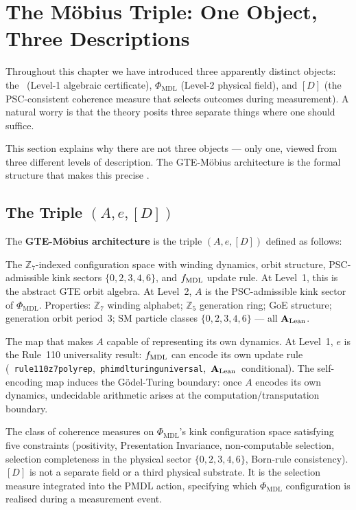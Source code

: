 \documentclass[11pt,openany]{book}
\theoremstyle{remark}
\newcommand{\PHIMDL}{\Phi_{\mathrm{MDL}}}
\newcommand{\ZS}{\mathbb{Z}_7}
\newcommand{\lean}[1]{%
  \penalty-100
  \begingroup\def\_{\textunderscore\allowbreak}\texttt{#1}\endgroup}
\newcommand{\CMCA}{\text{CMCA}}
\newcommand{\CatAL}{\ensuremath{\textbf{A}_{\rm Lean}}}
\begin{document}
\section{The M\"{o}bius Triple: One Object, Three Descriptions}
\label{sec:mobius}

Throughout this chapter we have introduced three apparently distinct objects: the \CMCA\
(Level-1 algebraic certificate), $\PHIMDL$ (Level-2 physical field), and $[D]$ (the
PSC-consistent coherence measure that selects outcomes during measurement).
A natural worry is that the theory posits three separate things where one should suffice.

This section explains why there are not three objects --- only one, viewed from three
different levels of description.
The GTE-Möbius architecture is the formal structure that makes this precise \cite{SpivackGTEMobius}.

\subsection*{The Triple $(A,e,[D])$}

The \textbf{GTE-Möbius architecture} is the triple $(A, e, [D])$ defined as follows:

\begin{description}[itemsep=4pt]
\item[$A$ --- the arithmetic carrier:]
The $\ZS$-indexed configuration space with winding dynamics, orbit structure, PSC-admissible
kink sectors $\{0,2,3,4,6\}$, and $f_{\rm MDL}$ update rule.
At Level~1, this is the abstract GTE orbit algebra.
At Level~2, $A$ is the PSC-admissible kink sector of $\PHIMDL$.
Properties: $\ZS$ winding alphabet; $\mathbb{Z}_5$ generation ring; GoE structure; generation orbit period~3;
SM particle classes $\{0,2,3,4,6\}$ --- all \CatAL.

\item[$e$ --- the self-encoding map:]
The map that makes $A$ capable of representing its own dynamics.
At Level~1, $e$ is the Rule~110 universality result: $f_{\rm MDL}$ can encode its own
update rule \mbox{(\lean{rule110\_z7\_poly\_rep}, \lean{phimdl\_turing\_universal}, \CatAL\ conditional)}.
The self-encoding map induces the Gödel-Turing boundary: once $A$ encodes its own dynamics,
undecidable arithmetic arises at the computation/transputation boundary.

\item[{$[D]$} --- the PSC-consistent coherence measure:]
The class of coherence measures on $\PHIMDL$'s kink configuration space satisfying five
constraints (positivity, Presentation Invariance, non-computable selection, selection
completeness in the physical sector $\{0,2,3,4,6\}$, Born-rule consistency).
$[D]$ is not a separate field or a third physical substrate.
It is the selection measure integrated into the PMDL action, specifying which
$\PHIMDL$ configuration is realised during a measurement event.
\end{description}
\end{document}
